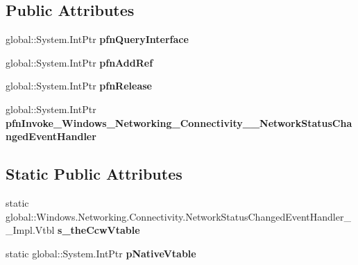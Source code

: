 \subsection*{Public Attributes}
\begin{DoxyCompactItemize}
\item 
\mbox{\label{struct_windows_1_1_networking_1_1_connectivity_1_1_network_status_changed_event_handler_____impl_1_1_vtbl_a1e8f66401649318bd765de957d08b4a7}} 
global\+::\+System.\+Int\+Ptr {\bfseries pfn\+Query\+Interface}
\item 
\mbox{\label{struct_windows_1_1_networking_1_1_connectivity_1_1_network_status_changed_event_handler_____impl_1_1_vtbl_a930aebfdb0833df6afd79cc12d7a2c71}} 
global\+::\+System.\+Int\+Ptr {\bfseries pfn\+Add\+Ref}
\item 
\mbox{\label{struct_windows_1_1_networking_1_1_connectivity_1_1_network_status_changed_event_handler_____impl_1_1_vtbl_a9a66546afb4270942179afd2a1a57d24}} 
global\+::\+System.\+Int\+Ptr {\bfseries pfn\+Release}
\item 
\mbox{\label{struct_windows_1_1_networking_1_1_connectivity_1_1_network_status_changed_event_handler_____impl_1_1_vtbl_a91bd7eef4346247e808661febbb48ff5}} 
global\+::\+System.\+Int\+Ptr {\bfseries pfn\+Invoke\+\_\+\+Windows\+\_\+\+Networking\+\_\+\+Connectivity\+\_\+\+\_\+\+Network\+Status\+Changed\+Event\+Handler}
\end{DoxyCompactItemize}
\subsection*{Static Public Attributes}
\begin{DoxyCompactItemize}
\item 
\mbox{\label{struct_windows_1_1_networking_1_1_connectivity_1_1_network_status_changed_event_handler_____impl_1_1_vtbl_aea023cece20ea485a0faef3323befa28}} 
static global\+::\+Windows.\+Networking.\+Connectivity.\+Network\+Status\+Changed\+Event\+Handler\+\_\+\+\_\+\+Impl.\+Vtbl {\bfseries s\+\_\+the\+Ccw\+Vtable}
\item 
\mbox{\label{struct_windows_1_1_networking_1_1_connectivity_1_1_network_status_changed_event_handler_____impl_1_1_vtbl_a0be2f2aa22896bf8905e94c3cfa6a139}} 
static global\+::\+System.\+Int\+Ptr {\bfseries p\+Native\+Vtable}
\end{DoxyCompactItemize}


